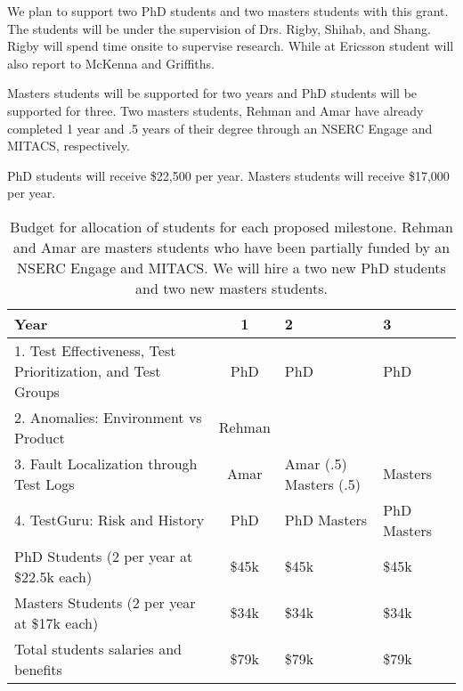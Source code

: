 \documentclass[12pt, letterpaper]{article}
\begin{document}
\fancyhead{}
\pagestyle{fancy}
\renewcommand{\headrulewidth}{0pt}

\begin{center}
\begin{LARGE}
\noindent
{}
\end{LARGE}
\end{center}


We plan to support two PhD students and two masters students with this grant.
The students will be under the supervision of Drs. Rigby, Shihab, and Shang. Rigby will spend time onsite to supervise research. While at Ericsson student will also report to McKenna and Griffiths.

Masters students will be supported for two years and PhD students will be supported for three. Two masters students, Rehman and Amar have already completed 1 year and .5 years of their degree through an NSERC Engage and MITACS, respectively.

PhD students will receive \$22,500 per year. Masters students will receive \$17,000 per year. 

\begin{table}[h]
\center
\caption{Budget for allocation of students for each proposed milestone. Rehman and Amar are masters students who have been partially funded by an NSERC Engage and MITACS. We will hire a two new PhD students and two new masters students.}
\label{tableHQP}
\vspace{+3mm}

\begin{tabular}{  l | c | p{21mm} | p{20mm}  }
\hline
	\textbf{Year} & 1 & 2 & 3 \\ \hline
	1. Test Effectiveness, Test Prioritization, and Test Groups & PhD & PhD & PhD \\ 
	2. Anomalies: Environment vs Product & Rehman &  & \  \\ 
	3. Fault Localization through Test Logs & Amar & Amar (.5) Masters (.5) & Masters \\ 
	4. TestGuru: Risk and History & PhD & PhD \newline Masters &  PhD \newline Masters  \  \\ \hline
\hline
	PhD Students (2 per year at \$22.5k each) & \$45k & \$45k & \$45k \\ \hline
	Masters Students (2 per year at \$17k each) & \$34k & \$34k & \$34k \\ \hline
\hline
	Total students salaries and benefits & \$79k & \$79k & \$79k \\ \hline

\end{tabular}

\end{table}
\end{document}
